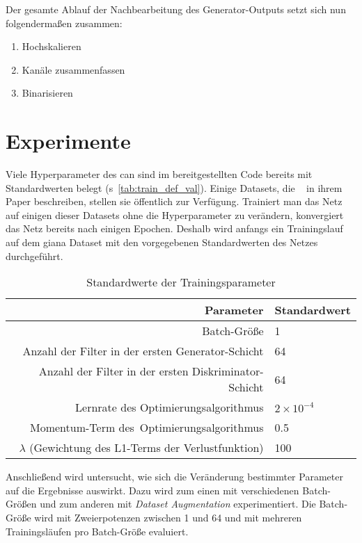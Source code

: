 Der gesamte Ablauf der Nachbearbeitung des Generator-Outputs setzt sich nun folgendermaßen zusammen:

\begin{enumerate}
	\item Hochskalieren
	\item Kanäle zusammenfassen
	\item Binarisieren
\end{enumerate}



\section{Experimente}\label{sec:experiments}

Viele Hyperparameter des \gls{can} sind im bereitgestellten Code bereits mit Standardwerten belegt (s~\autoref{tab:train_def_val}).
Einige Datasets, die \citeauthor{Isola.2017}~\cite{Isola.2017} in ihrem Paper beschreiben, stellen sie öffentlich zur Verfügung.
Trainiert man das Netz auf einigen dieser Datasets ohne die Hyperparameter zu verändern, konvergiert das Netz bereits nach einigen Epochen.
Deshalb wird anfangs ein Trainingslauf auf dem \gls{giana} Dataset mit den vorgegebenen Standardwerten des Netzes durchgeführt.

\begin{table}
	\centering
	\caption{Standardwerte der Trainingsparameter}
	\label{tab:train_def_val}
	\begin{tabular}{rl} 
		\toprule
		Parameter & Standardwert \\ 
		\midrule
		Batch-Größe & 1 \\
		Anzahl der Filter in der ersten Generator-Schicht & 64 \\
		Anzahl der Filter in der ersten Diskriminator-Schicht & 64 \\
		Lernrate des Optimierungsalgorithmus & $ 2 \times 10^{-4} $ \\
		Momentum-Term des~Optimierungsalgorithmus & 0.5 \\
		$ \lambda $ (Gewichtung des L1-Terms der Verlustfunktion) & 100 \\
		\bottomrule
	\end{tabular}
\end{table}

Anschließend wird untersucht, wie sich die Veränderung bestimmter Parameter auf die Ergebnisse auswirkt.
Dazu wird zum einen mit verschiedenen Batch-Größen und zum anderen mit \emph{Dataset Augmentation} experimentiert.
Die Batch-Größe wird mit Zweierpotenzen zwischen 1 und 64 und mit mehreren Trainingsläufen pro Batch-Größe evaluiert.

